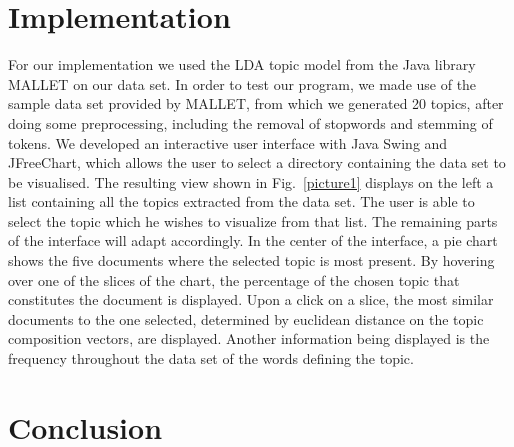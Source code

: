 \documentclass[11pt]{article}
\begin{document}
\section{Implementation}
%

For our implementation we used the LDA topic model from the Java library MALLET on our data set. In order to test our program, we made use of the sample data set provided by MALLET, from which we generated 20 topics, after doing some preprocessing, including the removal of stopwords and stemming of tokens. We developed an interactive user interface with Java Swing and JFreeChart, which allows the user to select a directory containing the data set to be visualised. The resulting view shown in Fig.~\ref{picture1} displays on the left a list containing all the topics extracted from the data set. The user is able to select the topic which he wishes to visualize from that list. The remaining parts of the interface will adapt accordingly. In the center of the interface, a pie chart shows the five documents where the selected topic is most present. By hovering over one of the slices of the chart, the percentage of the chosen topic that constitutes the document is displayed. Upon a click on a slice, the most similar documents to the one selected, determined by euclidean distance on the topic composition vectors, are displayed. Another information being displayed is the frequency throughout the data set of the words defining the topic.

\section{Conclusion}
%
\end{document}
